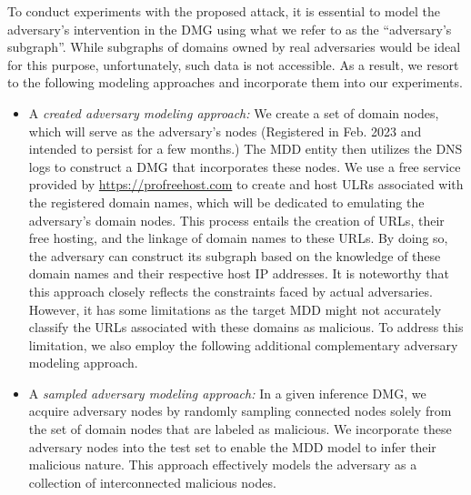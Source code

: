 \documentclass[conference,compsoc]{IEEEtran}
\begin{document}
\par To conduct experiments with the proposed attack, it is essential to model the adversary's intervention in the DMG using what we refer to as the ``adversary's subgraph''. While subgraphs of domains owned by real adversaries would be ideal for this purpose, unfortunately, such data is not accessible. As a result, we resort to the following modeling approaches and incorporate them into our experiments. 
\begin{itemize}[leftmargin=*]
\item A \textit{created adversary modeling approach:} We create a set of domain nodes, which will serve as the adversary's nodes (Registered in Feb. 2023 and intended to persist for a few months.) The MDD entity then utilizes the DNS logs to construct a DMG that incorporates these nodes. We use a free service provided by \url{https://profreehost.com} to create and host ULRs associated with the registered domain names, which will be dedicated to emulating the adversary's domain nodes. This process entails the creation of URLs, their free hosting, and the linkage of domain names to these URLs. By doing so, the adversary can construct its subgraph based on the knowledge of these domain names and their respective host IP addresses. It is noteworthy that this approach closely reflects the constraints faced by actual adversaries. However, it has some limitations as the target MDD might not accurately classify the URLs associated with these domains as malicious. To address this limitation, we also employ the following additional complementary adversary modeling approach.
\item A \textit{sampled adversary modeling approach:} In a given inference DMG, we acquire adversary nodes by randomly sampling connected nodes solely from the set of domain nodes that are labeled as malicious. We incorporate these adversary nodes into the test set to enable the MDD model to infer their malicious nature. This approach effectively models the adversary as a collection of interconnected malicious nodes.
\end{itemize}
\end{document}
